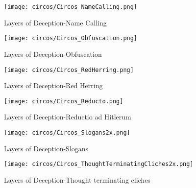 \begin{figure*}[htbp]    
    \begin{subfigure}[b]{0.50\textwidth}
    \centering
        \texttt{[image: circos/Circos\_NameCalling.png]}
        \caption{Layers of Deception-Name Calling}
    \end{subfigure}
    \begin{subfigure}[b]{0.50\textwidth}
    \centering
        \texttt{[image: circos/Circos\_Obfuscation.png]}
        \caption{Layers of Deception-Obfuscation}
    \end{subfigure}
    \begin{subfigure}[b]{0.50\textwidth}
    \centering
        \texttt{[image: circos/Circos\_RedHerring.png]}
        \caption{Layers of Deception-Red Herring}
    \end{subfigure}
    \begin{subfigure}[b]{0.50\textwidth}
    \centering
        \texttt{[image: circos/Circos\_Reducto.png]}
        \caption{Layers of Deception-Reductio ad Hitlerum}
    \end{subfigure}
    \begin{subfigure}[b]{0.50\textwidth}
    \centering
        \texttt{[image: circos/Circos\_Slogans2x.png]}
        \caption{Layers of Deception-Slogans}
    \end{subfigure}    
    \begin{subfigure}[b]{0.50\textwidth}
    \centering
        \texttt{[image: circos/Circos\_ThoughtTerminatingCliches2x.png]}
        \caption{Layers of Deception-Thought terminating cliches}
    \end{subfigure}
\end{figure*}

